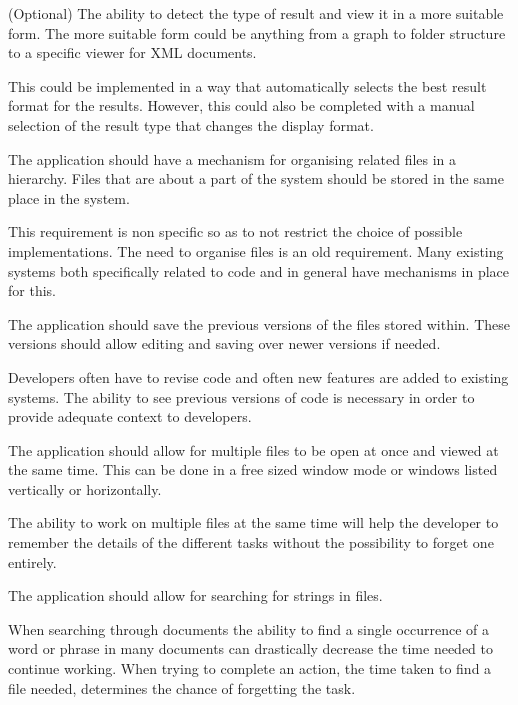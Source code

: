 \begin{requirement}{(Optional)}
The ability to detect the type of result and view it in a
more suitable form. The more suitable form could be anything from a
graph to folder structure to a specific viewer for XML documents.

This could be implemented in a way that automatically selects the best result
format for the results. However, this could also be completed with a manual
selection of the result type that changes the display format.
\end{requirement}

\begin{requirement}
The application should have a mechanism for organising related files in
a hierarchy. Files that are about a part of the system should be stored
in the same place in the system.

This requirement is non specific so as to not restrict the choice of possible
implementations. The need to organise files is an old requirement. Many
existing systems both specifically related to code and in general have
mechanisms in place for this.
\end{requirement}

\begin{requirement}
The application should save the previous versions of the files stored within.
These versions should allow editing and saving over newer versions if needed.

Developers often have to revise code and often new features are added to
existing systems. The ability to see previous versions of code is necessary in
order to provide adequate context to developers.
\end{requirement}

\begin{requirement}
The application should allow for multiple files to
be open at once and viewed at the same time. This can be done in a free
sized window mode or windows listed vertically or horizontally.

The ability to work on multiple files at the same time will help the developer
to remember the details of the different tasks without the possibility to
forget one entirely.
\end{requirement}

\begin{requirement}
The application should allow for searching for strings in files.

When searching through documents the ability to find a single occurrence of a
word or phrase in many documents can drastically decrease the time needed to
continue working. When trying to complete an action, the time taken to find a
file needed, determines the chance of forgetting the task.
\end{requirement}

